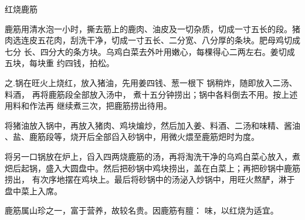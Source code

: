 \begin{recipe}{红烧鹿筋}

\ingredients


\preparation

\step 鹿筋用清水泡一小时，撕去筋上的鹿肉、油皮及一切杂质，切成一寸五长的段。猪
肉选连皮五花肉，刮洗干净，切成一寸五长、二分宽、八分厚的条块。肥母鸡切成七分
长、四分大的条方块。乌鸡白菜去外叶用嫩心，每棵得心二两左右。姜切成五块，每块重
约四钱，拍松。

之.锅在旺火上烧红，放入猪油，先用姜四钱、葱一根下 锅稍炸，随即放入二汤、料酒，
再将鹿筋段全部放入汤中， 煮十五分钟捞出；锅中各料倒去不用。按上述用料和作法再
继续煮三次，把鹿筋捞出待用。

\step 将猪油放入锅中，再放入猪肉、鸡块煸炒，然后加入姜、料酒、二汤和味精、酱油
、盐、鹿筋段等，烧开后全部舀入砂锅中，用微火煨至鹿筋𤆵时为度。

\step 将另一口锅放在炉上，舀入四两烧鹿筋的汤，再将淘洗干净的乌鸡白菜心放入，煮
𤆵后起锅，盛入大圆盘中。然后把砂锅中鸡块捞出，盖在白菜上；再把砂锅中鹿筋捞出，
有次序地摆在鸡块上。最后将砂锅中的汤泌入炒锅中，用旺火熬酽，淋于盘中菜上入席。

\features

鹿筋属山珍之一，富于营养，故较名贵。因鹿筋有膻： 味，以红烧为适宜。

\end{recipe}

